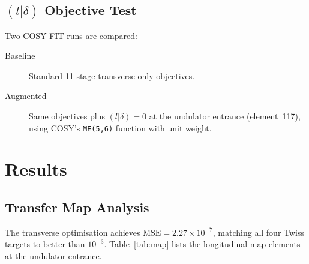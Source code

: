 \documentclass[11pt]{article}
\begin{document}
\subsection{$(l|\delta)$ Objective Test}

Two COSY FIT runs are compared:
\begin{description}
  \item[Baseline] Standard 11-stage transverse-only objectives.
  \item[Augmented] Same objectives plus $(l|\delta) = 0$ at the undulator
    entrance (element~117), using COSY's \texttt{ME(5,6)} function with
    unit weight.
\end{description}


\section{Results}

\subsection{Transfer Map Analysis}
\label{sec:results-map}

The transverse optimisation achieves $\text{MSE} = 2.27\times10^{-7}$,
matching all four Twiss targets to better than $10^{-3}$.
Table~\ref{tab:map} lists the longitudinal map elements at the undulator
entrance.
\end{document}
